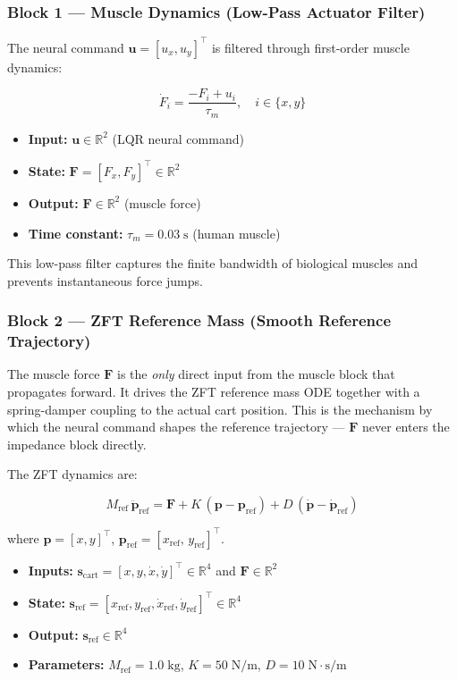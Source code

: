 \documentclass[11pt, a4paper]{article}
\begin{document}
\subsubsection*{Block 1 — Muscle Dynamics (Low-Pass Actuator Filter)}

The neural command $\bm{u} = [u_x, u_y]^{\top}$ is filtered through
first-order muscle dynamics:

\[
\boxed{
\dot{F}_i = \frac{-F_i + u_i}{\tau_m}, \quad i \in \{x, y\}
}
\]

\begin{itemize}
  \item \textbf{Input:} $\bm{u} \in \mathbb{R}^2$ (LQR neural command)
  \item \textbf{State:} $\bm{F} = [F_x, F_y]^{\top} \in \mathbb{R}^2$
  \item \textbf{Output:} $\bm{F} \in \mathbb{R}^2$ (muscle force)
  \item \textbf{Time constant:} $\tau_m = 0.03\;\mathrm{s}$ (human muscle)
\end{itemize}

This low-pass filter captures the finite bandwidth of biological muscles and
prevents instantaneous force jumps.

\subsubsection*{Block 2 — ZFT Reference Mass (Smooth Reference Trajectory)}

The muscle force $\bm{F}$ is the \emph{only} direct input from the muscle
block that propagates forward. It drives the ZFT reference mass ODE together
with a spring-damper coupling to the actual cart position. This is the
mechanism by which the neural command shapes the reference trajectory ---
$\bm{F}$ never enters the impedance block directly.

The ZFT dynamics are:

\[
\boxed{
M_{\mathrm{ref}}\,\ddot{\bm{p}}_{\mathrm{ref}}
= \bm{F} + K\,(\bm{p} - \bm{p}_{\mathrm{ref}})
         + D\,(\dot{\bm{p}} - \dot{\bm{p}}_{\mathrm{ref}})
}
\]

where $\bm{p} = [x, y]^{\top}$, $\bm{p}_{\mathrm{ref}} = [x_{\mathrm{ref}},\, y_{\mathrm{ref}}]^{\top}$.

\begin{itemize}
  \item \textbf{Inputs:}
        $\bm{s}_{\mathrm{cart}} = [x, y, \dot{x}, \dot{y}]^{\top} \in \mathbb{R}^4$
        and $\bm{F} \in \mathbb{R}^2$
  \item \textbf{State:}
        $\bm{s}_{\mathrm{ref}} = [x_{\mathrm{ref}}, y_{\mathrm{ref}},
        \dot{x}_{\mathrm{ref}}, \dot{y}_{\mathrm{ref}}]^{\top} \in \mathbb{R}^4$
  \item \textbf{Output:} $\bm{s}_{\mathrm{ref}} \in \mathbb{R}^4$
  \item \textbf{Parameters:} $M_{\mathrm{ref}} = 1.0\;\mathrm{kg}$,
        $K = 50\;\mathrm{N/m}$, $D = 10\;\mathrm{N\cdot s/m}$
\end{itemize}
\end{document}
